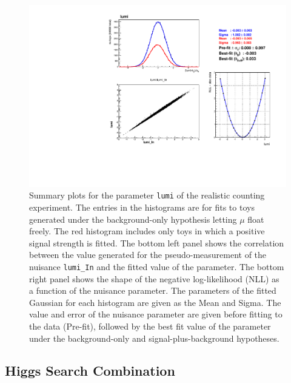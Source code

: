 \begin{figure}
  \begin{center}
    \includegraphics[width=\textwidth]{combinations/diagnostics/tree_fit_sb_lumi.pdf}
  \end{center}
    \caption{Summary plots for the parameter \texttt{lumi} of the realistic counting experiment. 
	The entries in the histograms are for fits to toys generated under the background-only
	hypothesis letting $\mu$ float freely. The red histogram includes only toys in which a positive signal strength is fitted.
	The bottom left panel shows the correlation
	between the value generated for the pseudo-measurement of the nuisance 
	\texttt{lumi\_In} and the fitted value of the parameter. 
	The bottom right panel shows the shape of the 
	negative log-likelihood (NLL) as a function of the nuisance parameter.
	The parameters of the fitted Gaussian for each histogram are given as the
	Mean and Sigma. The value and error of the nuisance parameter are given before fitting
	to the data (Pre-fit), followed by the best fit value of the parameter 
	under the background-only and signal-plus-background hypotheses.}
    \label{fig:real_lumi_s}
\end{figure}

\subsection{Higgs Search Combination}
\label{combinedsearchresults}

